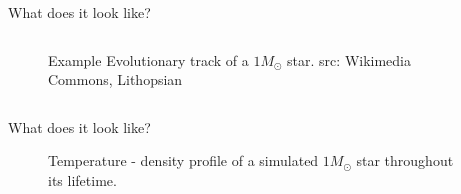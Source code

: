 \documentclass{beamer}
\begin{document}
\begin{frame}{What does it look like?}
\begin{columns}
\begin{column}{0.5\textwidth}
\begin{center}
\begin{figure}
                    \caption{Example Evolutionary track of a $1 M_\odot$ star. src: Wikimedia Commons, Lithopsian}
                    \label{fig:hr_example_1m}
                \end{figure}
            \end{center}
        \end{column}
    \end{columns}      
\end{frame}

\begin{frame}{What does it look like?}
    \begin{center}
        \begin{figure}
            \caption{Temperature - density profile of a simulated $1M_\odot$ star throughout its lifetime.}
            \label{fig:trho_1M_02Z}
        \end{figure}
    \end{center}
\end{frame}
\end{document}
